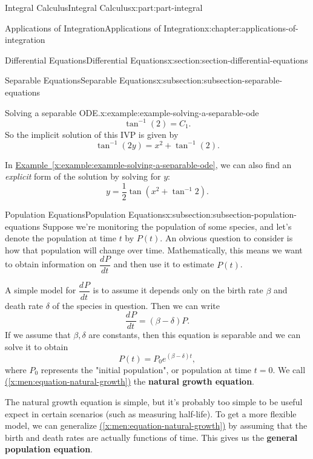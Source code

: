 \documentclass[twoside,10pt,]{tufte-book}
\newcommand{\xreffont}{\relax}
\newcommand{\terminology}[1]{\textbf{#1}}
\numberwithin{equation}{part}
\newcommand{\dv}[3][]{\dfrac{d^{#1} #2}{d #3^{#1}}}
\begin{document}
\begin{partptx}{Integral Calculus}{}{Integral Calculus}{}{}{x:part:part-integral}
\begin{chapterptx}{Applications of Integration}{}{Applications of Integration}{}{}{x:chapter:applications-of-integration}
\begin{sectionptx}{Differential Equations}{}{Differential Equations}{}{}{x:section:section-differential-equations}
\begin{subsectionptx}{Separable Equations}{}{Separable Equations}{}{}{x:subsection:subsection-separable-equations}
\begin{example}{Solving a separable ODE.}{x:example:example-solving-a-separable-ode}
\begin{equation*}
\tan^{-1}(2) = C_{1}.
\end{equation*}
So the implicit solution of this IVP is given by%
\begin{equation*}
\tan^{-1}(2y) = x^{2}+\tan^{-1}(2).
\end{equation*}
%
\end{example}
In \hyperref[x:example:example-solving-a-separable-ode]{Example~{\xreffont\ref{x:example:example-solving-a-separable-ode}}}, we can also find an \emph{explicit} form of the solution by solving for \(y\):%
\begin{equation*}
y = \frac{1}{2}\tan(x^{2} + \tan^{-1}2).
\end{equation*}
%
\end{subsectionptx}
%
%
\typeout{************************************************}
\typeout{************************************************}
%
\begin{subsectionptx}{Population Equations}{}{Population Equations}{}{}{x:subsection:subsection-population-equations}
Suppose we're monitoring the population of some species, and let's denote the population at time \(t\) by \(P(t)\). An obvious question to consider is how that population will change over time. Mathematically, this means we want to obtain information on \(\dv{P}{t}\) and then use it to estimate \(P(t)\).%
\par
A simple model for \(\dv{P}{t}\) is to assume it depends only on the birth rate \(\beta\) and death rate \(\delta\) of the species in question. Then we can write%
\begin{equation}
\dv{P}{t} = (\beta - \delta)P.\label{x:men:equation-natural-growth}
\end{equation}
If we assume that \(\beta,\delta\) are constants, then this equation is separable and we can solve it to obtain%
\begin{equation*}
P(t) = P_{0}e^{(\beta - \delta)t},
\end{equation*}
where \(P_{0}\) represents the "initial population", or population at time \(t = 0\). We call \hyperref[x:men:equation-natural-growth]{({\xreffont\ref{x:men:equation-natural-growth}})} the \terminology{natural growth equation}.%
\par
The natural growth equation is simple, but it's probably too simple to be useful expect in certain scenarios (such as measuring half-life). To get a more flexible model, we can generalize \hyperref[x:men:equation-natural-growth]{({\xreffont\ref{x:men:equation-natural-growth}})} by assuming that the birth and death rates are actually functions of time. This gives us the \terminology{general population equation}.%

\end{subsectionptx}
\end{sectionptx}
\end{chapterptx}
\end{partptx}
\end{document}
